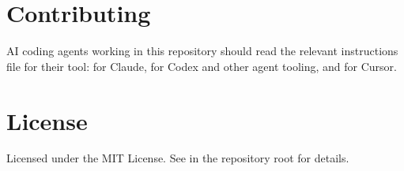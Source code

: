 \newcommand{\KqDocTitle}{KeyQuorum}
\newcommand{\KqDocSubtitle}{Manual}
\newcommand{\KqHeaderTitle}{KeyQuorum Manual}
\newcommand{\KqDocDescription}{%
A manual for the KeyQuorum hardware-key quorum file-sharing system: hardware
keys and devices, split-tree quorum protection, private sign bridges,
authenticated updates, moving identities between devices, sending files
directly, tracked files with their own signed history, and the mailbox relay that connects machines that are not open
together.
}



\KqTitlePage
\KqContents




















\section{Contributing}

AI coding agents working in this repository should read the relevant
instructions file for their tool:  for Claude,
 for Codex and other agent tooling, and 
for Cursor.

\section{License}

Licensed under the MIT License. See  in the repository root
for details.


